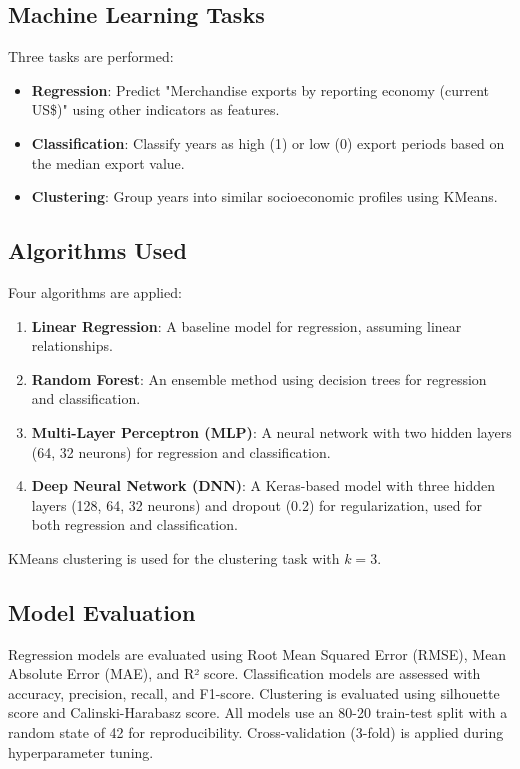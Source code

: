 \documentclass[12pt]{article}
\begin{document}
	\subsection{Machine Learning Tasks}
	Three tasks are performed:
	\begin{itemize}
		\item \textbf{Regression}: Predict "Merchandise exports by reporting economy (current US\$)" using other indicators as features.
		\item \textbf{Classification}: Classify years as high (1) or low (0) export periods based on the median export value.
		\item \textbf{Clustering}: Group years into similar socioeconomic profiles using KMeans.
	\end{itemize}
	
	\subsection{Algorithms Used}
	Four algorithms are applied:
	\begin{enumerate}
		\item \textbf{Linear Regression}: A baseline model for regression, assuming linear relationships.
		\item \textbf{Random Forest}: An ensemble method using decision trees for regression and classification.
		\item \textbf{Multi-Layer Perceptron (MLP)}: A neural network with two hidden layers (64, 32 neurons) for regression and classification.
		\item \textbf{Deep Neural Network (DNN)}: A Keras-based model with three hidden layers (128, 64, 32 neurons) and dropout (0.2) for regularization, used for both regression and classification.
	\end{enumerate}
	KMeans clustering is used for the clustering task with \( k=3 \).
	
	\subsection{Model Evaluation}
	Regression models are evaluated using Root Mean Squared Error (RMSE), Mean Absolute Error (MAE), and R² score. Classification models are assessed with accuracy, precision, recall, and F1-score. Clustering is evaluated using silhouette score and Calinski-Harabasz score. All models use an 80-20 train-test split with a random state of 42 for reproducibility. Cross-validation (3-fold) is applied during hyperparameter tuning.
	
\end{document}
